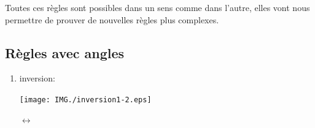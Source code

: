 \documentclass[a4paper,oneside]{book}
\begin{document}
Toutes ces règles sont possibles dans un sens comme dans l'autre, elles vont nous permettre de prouver de nouvelles règles plus complexes.

\subsection{Règles avec angles}

\begin{enumerate}
\item inversion:
\begin{center}
\begin{minipage}[c]{0.25\textwidth}
\flushright\texttt{[image: IMG./inversion1-2.eps]}
\end{minipage}
\hspace{0.5cm}\Huge{$\longleftrightarrow$}
\begin{minipage}[c]{0.25\textwidth}

\end{minipage}
\end{center}
\end{enumerate}
\end{document}
